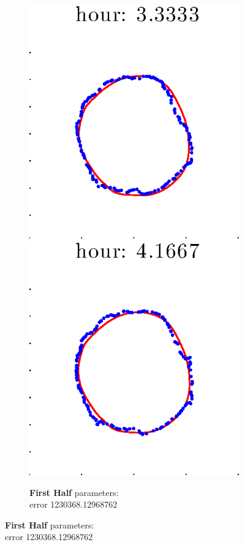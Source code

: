 \documentclass[12pt]{article}
\begin{document}
\begin{figure}[h!]
\begin{subfigure}[b]{.3\textwidth}
		\includegraphics[height=.15\textheight]{Pos0/firsthalf/first5.eps}
		\includegraphics[height=.15\textheight]{Pos0/firsthalf/first6.eps}
		\caption{\textbf{First Half} parameters: \\error 1230368.12968762}

\end{subfigure}
\end{figure}
\end{document}
